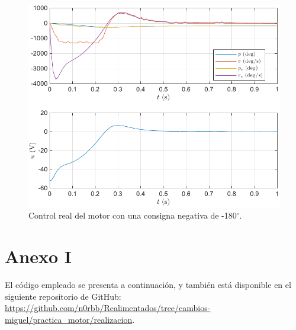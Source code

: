 \documentclass{article}
\newcommand{\degree}[0]{^{\circ}}
\begin{document}
\begin{figure}[H]
    \centering
    \includegraphics[width=0.75\linewidth]{img/controlRealNeg.pdf}
    \caption{Control real del motor con una consigna negativa de -180$\degree$.}
    \label{fig:controlRealNeg}
\end{figure}

\section*{Anexo I}

El código empleado se presenta a continuación, y también está disponible en el siguiente repositorio de GitHub: \url{https://github.com/n0rbb/Realimentados/tree/cambios-miguel/practica_motor/realizacion}.
\end{document}
